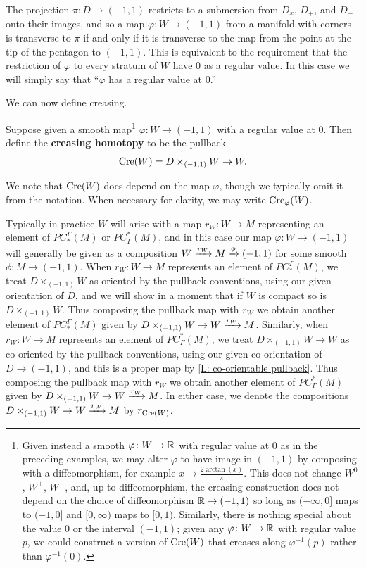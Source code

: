 The projection $\pi:D \to (-1,1)$ restricts to a submersion from $D_x$, $D_+$, and $D_-$ onto their images, and so a map $\varphi: W \to (-1,1)$ from a manifold with corners is transverse to $\pi$ if and only if it is transverse to the map from the point at the tip of the pentagon to $(-1,1)$. This is equivalent to the requirement that the restriction of $\varphi$ to every stratum of $W$ have $0$ as a regular value. In this case we will simply say that ``$\varphi$ has a regular value at $0$.''

We can now define creasing.

\begin{definition}
 Suppose given a smooth map\footnote{Given instead a smooth $\varphi \colon W \to \mathbb{R}$ with regular value at $0$ as in the preceding examples, we may alter $\varphi$ to have image in $(-1,1)$ by composing with a diffeomorphism, for example $x \to \frac{2\arctan(x)}{\pi}$. This does not change $W^0$, $W^+$, $W^-$, and, up to diffeomorphism, the creasing construction does not depend on the choice of diffeomorphism $\mathbb{R} \to (-1,1)$ so long as $(-\infty,0]$ maps to $(-1,0]$ and $[0,\infty)$ maps to $[0,1)$. Similarly, there is nothing special about the value $0$ or the interval $(-1,1)$; given any $\varphi \colon W \to \mathbb{R}$ with regular value $p$, we could construct a version of $\mathrm{Cre}(W)$ that creases along $\varphi^{-1}(p)$ rather than $\varphi^{-1}(0)$.
} $\varphi \colon W \to (-1,1)$ with a regular value at $0$. Then define the \textbf{creasing homotopy} to be the pullback
$$\mathrm{Cre}(W) = D\times_{(-1,1)} W \to W.$$

We note that
$\mathrm{Cre}(W)$ does depend on the map $\varphi$, though we typically omit it from the notation. When necessary for clarity, we may write $\mathrm{Cre}_\varphi(W)$.


Typically in practice $W$ will arise with a map $r_W \colon W \to M$ representing an element of $PC_*^\Gamma(M)$ or $PC^*_\Gamma(M)$, and in this case our map $\varphi: W \to (-1,1)$ will generally be given as a composition
 $W \xrightarrow{r_W}M \xrightarrow{\phi} (-1,1)$ for some smooth $\phi \colon M \to (-1,1)$. When $r_W \colon W \to M$ represents an element of $PC_*^\Gamma(M)$, we treat $D\times_{(-1,1)} W$ as oriented by the pullback conventions, using our given orientation of $D$, and we will show in a moment that if $W$ is compact so is $D\times_{(-1,1)} W$. Thus composing the pullback map with $r_W$ we obtain another element of $PC_*^\Gamma(M)$ given by $D\times_{(-1,1)} W \to W \xrightarrow{r_W}M$. Similarly, when $r_W \colon W \to M$ represents an element of $PC^*_\Gamma(M)$, we treat $D\times_{(-1,1)} W \to W$ as co-oriented by the pullback conventions, using our given co-orientation of $D \to (-1,1)$, and this is a proper map by \cref{L: co-orientable pullback}.
Thus composing the pullback map with $r_W$ we obtain another element of $PC^*_\Gamma(M)$ given by $D\times_{(-1,1)} W \to W \xrightarrow{r_W}M$. In either case, we denote the compositions $D\times_{(-1,1)} W \to W \xrightarrow{r_W}M$ by $r_{\mathrm{Cre}(W)}$.


\end{definition}
